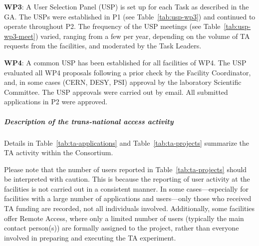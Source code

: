 \textbf{WP3}: A User Selection Panel (USP) is set up for each Task as described in the GA. The USPs were established in P1 (see Table~\ref{tab:usp-wp3}) and continued to operate throughout P2. The frequency of the USP meetings (see Table~\ref{tab:usp-wp3-meet}) varied, ranging from a few per year, depending on the volume of TA requests from the facilities, and moderated by the Task Leaders.

\textbf{WP4}: \mbox{}
A common USP has been established for all facilities of WP4. The USP evaluated all WP4 proposals following a prior check by the Facility Coordinator, and, in some cases (CERN, DESY, PSI) approval by the laboratory Scientific Committee. The USP approvals were carried out by email. All submitted applications in P2 were approved.


\subparagraph{Description of the trans-national access activity}\mbox{}

Details in Table~\ref{tab:ta-applications} and Table~\ref{tab:ta-projects} summarize the TA activity within the Consortium.

Please note that the number of users reported in Table~\ref{tab:ta-projects} should be interpreted with caution. This is because the reporting of user activity at the facilities is not carried out in a consistent manner. In some cases—especially for facilities with a large number of applications and users—only those who received TA funding are recorded, not all individuals involved. Additionally, some facilities offer Remote Access, where only a limited number of users (typically the main contact person(s)) are formally assigned to the project, rather than everyone involved in preparing and executing the TA experiment.


